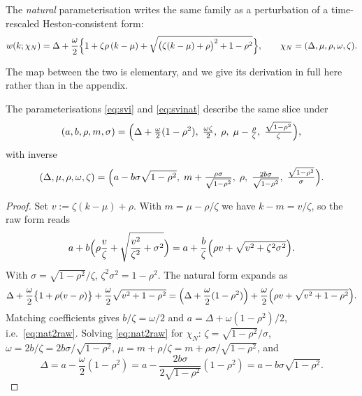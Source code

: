 The \emph{natural} parameterisation writes the same family as a perturbation of a
time-rescaled Heston-consistent form:
\begin{equation}\label{eq:svinat}
w(k;\chi_N)=\Delta+\frac{\omega}{2}
\Bigl\{1+\zeta\rho\,(k-\mu)+\sqrt{\bigl(\zeta(k-\mu)+\rho\bigr)^2+1-\rho^2}\Bigr\},
\qquad \chi_N=(\Delta,\mu,\rho,\omega,\zeta).
\end{equation}

The map between the two is elementary, and we give its derivation in full here rather than in the
appendix.

\begin{lemma}
\label{lem:rawnat}
The parameterisations \eqref{eq:svi} and \eqref{eq:svinat} describe the same slice under
\begin{equation}\label{eq:nat2raw}
(a,b,\rho,m,\sigma)
=\Bigl(\Delta+\tfrac{\omega}{2}(1-\rho^2),\;\tfrac{\omega\zeta}{2},\;\rho,\;
\mu-\tfrac{\rho}{\zeta},\;\tfrac{\sqrt{1-\rho^2}}{\zeta}\Bigr),
\end{equation}
with inverse
\begin{equation}\label{eq:raw2nat}
(\Delta,\mu,\rho,\omega,\zeta)
=\Bigl(a- b\sigma\sqrt{1-\rho^2} ,\;
m+\tfrac{\rho\sigma}{\sqrt{1-\rho^2}},\;\rho,\;
\tfrac{2b\sigma}{\sqrt{1-\rho^2}},\;\tfrac{\sqrt{1-\rho^2}}{\sigma}\Bigr).
\end{equation}
\end{lemma}

\begin{proof}
Set $v:=\zeta(k-\mu)+\rho$. With $m=\mu-\rho/\zeta$ we have $k-m=v/\zeta$, so the raw form
reads
\[
a+b\Bigl(\rho\frac{v}{\zeta}+\sqrt{\frac{v^2}{\zeta^2}+\sigma^2}\Bigr)
=a+\frac{b}{\zeta}\Bigl(\rho v+\sqrt{v^2+\zeta^2\sigma^2}\Bigr).
\]
With $\sigma=\sqrt{1-\rho^2}/\zeta$, $\zeta^2\sigma^2=1-\rho^2$. The natural form expands as
\[
\Delta+\frac{\omega}{2}\bigl\{1+\rho(v-\rho)\bigr\}+\frac{\omega}{2}\sqrt{v^2+1-\rho^2}
=\Bigl(\Delta+\frac{\omega}{2}(1-\rho^2)\Bigr)
+\frac{\omega}{2}\Bigl(\rho v+\sqrt{v^2+1-\rho^2}\Bigr).
\]
Matching coefficients gives $b/\zeta=\omega/2$ and $a=\Delta+\omega(1-\rho^2)/2$, i.e.\
\eqref{eq:nat2raw}. Solving \eqref{eq:nat2raw} for $\chi_N$: $\zeta=\sqrt{1-\rho^2}/\sigma$,
$\omega=2b/\zeta=2b\sigma/\sqrt{1-\rho^2}$, $\mu=m+\rho/\zeta=m+\rho\sigma/\sqrt{1-\rho^2}$,
and
\[
\Delta=a-\frac{\omega}{2}(1-\rho^2)=a-\frac{2b\sigma}{2\sqrt{1-\rho^2}}(1-\rho^2)
=a-b\sigma\sqrt{1-\rho^2}.
\]
\end{proof}

